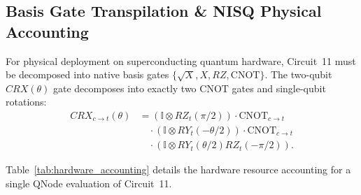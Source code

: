 \documentclass[pdflatex,sn-mathphys-num]{sn-jnl}%
\theoremstyle{thmstyleone}%
\theoremstyle{thmstyletwo}%
\theoremstyle{thmstylethree}%
\begin{document}
\subsection{Basis Gate Transpilation \& NISQ Physical Accounting}
For physical deployment on superconducting quantum hardware, Circuit~11 must be decomposed into native basis gates $\{\sqrt{X}, X, RZ, \mathrm{CNOT}\}$.
The two-qubit $CRX(\theta)$ gate decomposes into exactly two CNOT gates and single-qubit rotations:
\begin{align}
CRX_{c \to t}(\theta) &= (\mathbb{I} \otimes RZ_t(\pi/2)) \cdot \mathrm{CNOT}_{c \to t} \nonumber \\
&\quad \cdot (\mathbb{I} \otimes RY_t(-\theta/2)) \cdot \mathrm{CNOT}_{c \to t} \nonumber \\
&\quad \cdot (\mathbb{I} \otimes RY_t(\theta/2) RZ_t(-\pi/2)).
\label{eq:crx_transpilation}
\end{align}

Table~\ref{tab:hardware_accounting} details the hardware resource accounting for a single QNode evaluation of Circuit~11.

\begin{table}[htbp]
\centering
\caption{Native Basis Gate Transpilation Accounting for Circuit~11 (4 Qubits)}
\label{tab:hardware_accounting}
\renewcommand{\arraystretch}{1.08}
\end{table}
\end{document}
